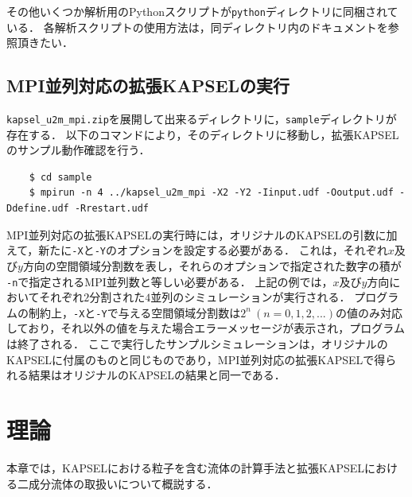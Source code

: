 \documentclass[pdflatex,a4paper,10pt,ja=standard]{bxjsarticle}
\begin{document}
その他いくつか解析用のPythonスクリプトが\verb|python|ディレクトリに同梱されている．
各解析スクリプトの使用方法は，同ディレクトリ内のドキュメントを参照頂きたい．

\subsection{MPI並列対応の拡張KAPSELの実行}

\verb|kapsel_u2m_mpi.zip|を展開して出来るディレクトリに，\verb|sample|ディレクトリが存在する．
以下のコマンドにより，そのディレクトリに移動し，拡張KAPSELのサンプル動作確認を行う．
\begin{verbatim}
    $ cd sample
    $ mpirun -n 4 ../kapsel_u2m_mpi -X2 -Y2 -Iinput.udf -Ooutput.udf -Ddefine.udf -Rrestart.udf
\end{verbatim}

MPI並列対応の拡張KAPSELの実行時には，オリジナルのKAPSELの引数に加えて，新たに\verb|-X|と\verb|-Y|のオプションを設定する必要がある．
これは，それぞれ$x$及び$y$方向の空間領域分割数を表し，それらのオプションで指定された数字の積が
\verb|-n|で指定されるMPI並列数と等しい必要がある．
上記の例では，$x$及び$y$方向においてそれぞれ$2$分割された$4$並列のシミュレーションが実行される．
プログラムの制約上，\verb|-X|と\verb|-Y|で与える空間領域分割数は$2^{n} ~ (n = 0, 1, 2, ...)$の値のみ対応しており，それ以外の値を与えた場合エラーメッセージが表示され，プログラムは終了される．
ここで実行したサンプルシミュレーションは，オリジナルのKAPSELに付属のものと同じものであり，MPI並列対応の拡張KAPSELで得られる結果はオリジナルのKAPSELの結果と同一である．

\section{理論}
\label{sec:theory}
本章では，KAPSELにおける粒子を含む流体の計算手法と拡張KAPSELにおける二成分流体の取扱いについて概説する．
\end{document}

